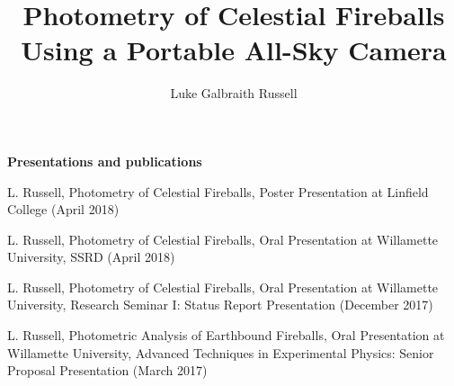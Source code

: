 \documentclass[12pt]{report}
\begin{document}
\title{Photometry of Celestial Fireballs Using a Portable All-Sky Camera}
\author{Luke Galbraith Russell}

\maketitle


\newpage

\begin{center}
\textbf{Presentations and publications}

L. Russell, Photometry of Celestial Fireballs, Poster Presentation at Linfield College (April 2018)
\bigskip

L. Russell, Photometry of Celestial Fireballs, Oral Presentation at Willamette University, SSRD (April 2018)
\bigskip

L. Russell, Photometry of Celestial Fireballs, Oral Presentation at Willamette University, Research Seminar I: Status Report Presentation (December 2017)
\bigskip

L. Russell, Photometric Analysis of Earthbound Fireballs, Oral Presentation at Willamette University, Advanced Techniques in Experimental Physics: Senior Proposal Presentation (March 2017)
\bigskip
\end{center}



\begin{acknowledgments}

\end{acknowledgments}

\begin{abstract}

\end{abstract}

\tableofcontents
\listoffigures








%



\appendix
%
\end{document}
